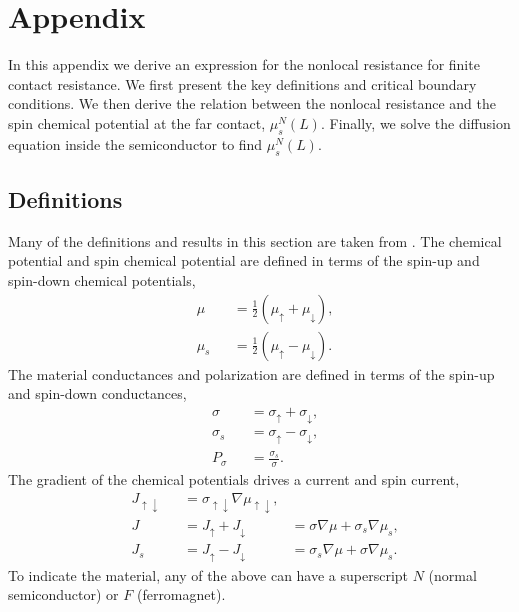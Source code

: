 \section{Appendix}

In this appendix we derive an expression for
the nonlocal resistance for finite contact resistance.
We first present the key definitions and critical boundary conditions.
We then derive the relation between the nonlocal resistance
and the spin chemical potential at the far contact, $μ_s^N (L)$.
Finally, we solve the diffusion equation
inside the semiconductor to find $μ_s^N (L)$.

\subsection{Definitions}

Many of the definitions and results in this section are taken from
\cite{ActaPhysicaSlovaca.57.4_5.565-907}.
The chemical potential and spin chemical potential are defined in terms
of the spin-up and spin-down chemical potentials,
\begin{subequations}
  \label{eq:potentials}
  \begin{alignat}{2}
    & μ   && = \frac{1}{2} \left( μ_↑ + μ_↓ \right), \\
    & μ_s && = \frac{1}{2} \left( μ_↑ - μ_↓ \right).
  \end{alignat}
\end{subequations}
The material conductances and polarization are defined in terms
of the spin-up and spin-down conductances,
\begin{subequations}
  \label{eq:conductances}
  \begin{alignat}{2}
    & σ   && = σ_↑ + σ_↓, \\
    & σ_s && = σ_↑ - σ_↓, \\
    \label{eq:material.polarization}
    & P_σ && = \frac{σ_s}{σ}.
  \end{alignat}
\end{subequations}
The gradient of the chemical potentials drives a current and spin current,
\begin{subequations}
  \label{eq:currents}
  \begin{alignat}{3}
    & J_{↑↓} && = σ_{↑↓} ∇μ_{↑↓}, \\
    \label{eq:currents.current}
    & J      && = J_↑ + J_↓ & = σ   ∇μ + σ_s ∇μ_s, \\
    \label{eq:currents.spincurrent}
    & J_s    && = J_↑ - J_↓ & = σ_s ∇μ + σ   ∇μ_s.
  \end{alignat}
\end{subequations}
To indicate the material, any of the above can have a superscript
$N$ (normal semiconductor) or $F$ (ferromagnet).

